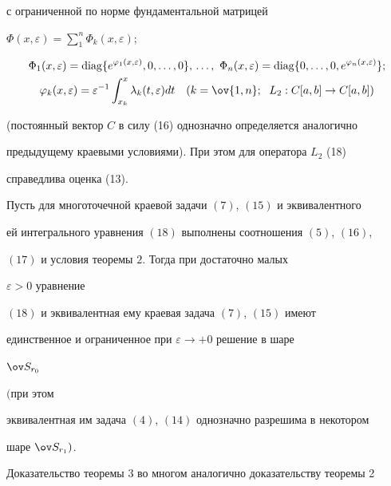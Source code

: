 с ограниченной по норме фундаментальной матрицей 


$\Phi(x,\varepsilon)=\sum\limits^n_1\Phi_k(x,\varepsilon)$; 


\begin{gather*} 


\Phi_1(x,\varepsilon)=\diag\{e^{\varphi_1(x,\varepsilon)}, 


0,\dotsc,0\},\,\dotsc,\ \Phi_n(x,\varepsilon)=\diag


\{0,\dotsc,0,e^{\varphi_n(x,\varepsilon)}\};\\


\varphi_k(x,\varepsilon)=\varepsilon^{-1}\int^x_{x_k}


\lambda_k(t,\varepsilon)dt\quad


(k=\ov{1,n};\ \; L_2:C[a,b]\to C[a,b])


\end{gather*} 


(постоянный вектор $C$ в силу (16) однозначно определяется аналогично 


предыдущему краевыми условиями). При этом для оператора $L_2$ (18) 


справедлива оценка (13). 


 


\begin{thm} 


Пусть для многоточечной краевой задачи $(7)$, $(15)$ и эквивалентного 


ей интегрального уравнения $(18)$ выполнены соотношения $(5)$, $(16)$, 


$(17)$ и условия теоремы $2$. Тогда при достаточно малых 


$\varepsilon>0$ уравнение 


$(18)$ и эквивалентная ему краевая задача $(7)$, $(15)$ имеют 


единственное и ограниченное при $\varepsilon\to+0$ решение в шаре 


$\ov S_{r_0}$ 


$($при этом 


эквивалентная им задача $(4)$, $(14)$ однозначно разрешима в некотором 


шаре $\ov S_{r_1})$. 


\end{thm} 


 


Доказательство теоремы 3 во многом аналогично доказательству теоремы 2 


